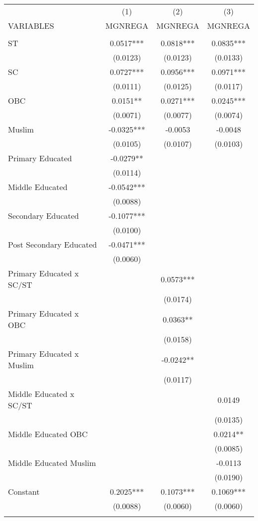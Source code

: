 \documentclass{article}
\begin{document}
\begin{table}[]
\small
    \centering
    \begin{tabular}{lccc} \hline
 & (1) & (2) & (3) \\
VARIABLES & MGNREGA & MGNREGA & MGNREGA \\ \hline\hline
 &  &  &  \\
ST & 0.0517*** & 0.0818*** & 0.0835*** \\
 & (0.0123) & (0.0123) & (0.0133) \\
SC & 0.0727*** & 0.0956*** & 0.0971*** \\
 & (0.0111) & (0.0125) & (0.0117) \\
OBC & 0.0151** & 0.0271*** & 0.0245*** \\
 & (0.0071) & (0.0077) & (0.0074) \\
Muslim & -0.0325*** & -0.0053 & -0.0048 \\
 & (0.0105) & (0.0107) & (0.0103) \\
Primary Educated & -0.0279** &  &  \\
 & (0.0114) &  &  \\
Middle Educated & -0.0542*** &  &  \\
 & (0.0088) &  &  \\
Secondary Educated & -0.1077*** &  &  \\
 & (0.0100) &  &  \\
Post Secondary Educated & -0.0471*** &  &  \\
 & (0.0060) &  &  \\
Primary Educated x SC/ST &  & 0.0573*** &  \\
 &  & (0.0174) &  \\
Primary Educated x OBC &  & 0.0363** &  \\
 &  & (0.0158) &  \\
Primary Educated x Muslim &  & -0.0242** &  \\
 &  & (0.0117) &  \\
Middle Educated x SC/ST &  &  & 0.0149 \\
 &  &  & (0.0135) \\
Middle Educated OBC &  &  & 0.0214** \\
 &  &  & (0.0085) \\
Middle Educated Muslim &  &  & -0.0113 \\
 &  &  & (0.0190) \\
Constant & 0.2025*** & 0.1073*** & 0.1069*** \\
 & (0.0088) & (0.0060) & (0.0060) \\
 &  &  &  \\

\end{tabular}
\end{table}
\end{document}
